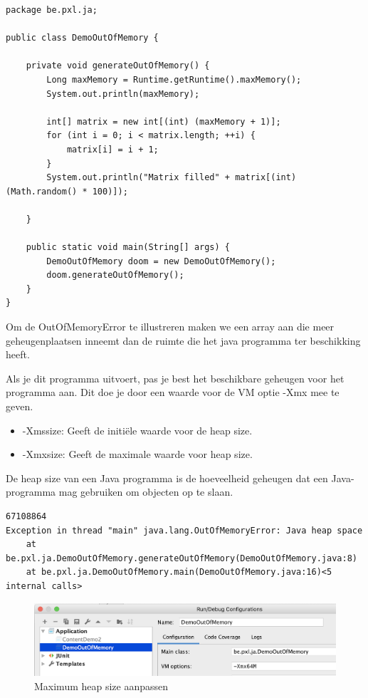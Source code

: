\begin{lstlisting}
package be.pxl.ja;

public class DemoOutOfMemory {

	private void generateOutOfMemory() {
		Long maxMemory = Runtime.getRuntime().maxMemory();
		System.out.println(maxMemory);

		int[] matrix = new int[(int) (maxMemory + 1)];
		for (int i = 0; i < matrix.length; ++i) {
			matrix[i] = i + 1;
		}
		System.out.println("Matrix filled" + matrix[(int)(Math.random() * 100)]);

	}

	public static void main(String[] args) {
		DemoOutOfMemory doom = new DemoOutOfMemory();
		doom.generateOutOfMemory();
	}
}
\end{lstlisting}

Om de OutOfMemoryError te illustreren maken we een array aan die meer geheugenplaatsen inneemt dan de ruimte die het java programma ter beschikking heeft.

Als je dit programma uitvoert, pas je best het beschikbare geheugen voor het programma aan. Dit doe je door een waarde voor de VM optie -Xmx mee te geven.

\begin{itemize}
\item -Xmssize: Geeft de initi\"ele waarde voor de heap size.
\item -Xmxsize: Geeft de maximale waarde voor heap size.
\end{itemize}

De heap size van een Java programma is de hoeveelheid geheugen dat een Java-programma mag gebruiken om objecten op te slaan.

\begin{verbatim}
67108864
Exception in thread "main" java.lang.OutOfMemoryError: Java heap space
	at be.pxl.ja.DemoOutOfMemory.generateOutOfMemory(DemoOutOfMemory.java:8)
	at be.pxl.ja.DemoOutOfMemory.main(DemoOutOfMemory.java:16)<5 internal calls>
\end{verbatim}
	
\begin{figure}[H]
\includegraphics[width=\linewidth]{images/h2/jvm_options_xmx.png}
\caption{Maximum heap size aanpassen}
\label{fig:exceptiono_hierarchy}
\end{figure}

